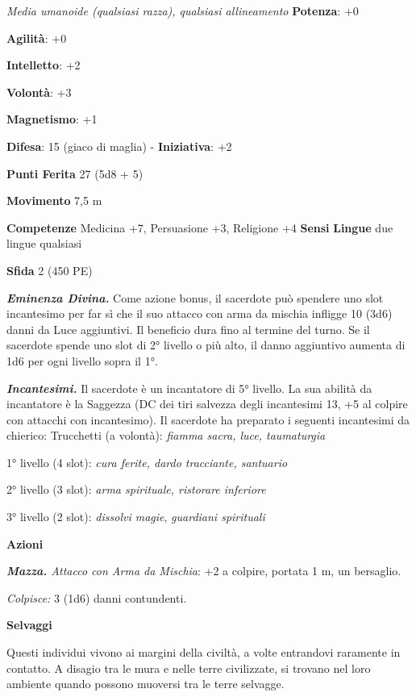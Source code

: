 \begin{multicols}{2}
\emph{Media umanoide (qualsiasi razza), qualsiasi allineamento}
\textbf{Potenza}: +0

\textbf{Agilità}: +0

\textbf{Intelletto}: +2

\textbf{Volontà}: +3

\textbf{Magnetismo}: +1

\textbf{Difesa}: 15 (giaco di maglia) - \textbf{Iniziativa}: +2

\textbf{Punti Ferita} 27 (5d8 + 5)

\textbf{Movimento} 7,5 m

\textbf{Competenze} Medicina +7, Persuasione +3, Religione +4
\textbf{Sensi}  \textbf{Lingue} due lingue
qualsiasi

\textbf{Sfida} 2 (450 PE)\smallskip

\emph{\textbf{Eminenza Divina.}} Come azione bonus, il sacerdote può
spendere uno slot incantesimo per far sì che il suo attacco con arma da
mischia infligge 10 (3d6) danni da Luce aggiuntivi. Il beneficio dura
fino al termine del turno. Se il sacerdote spende uno slot di 2° livello
o più alto, il danno aggiuntivo aumenta di 1d6 per ogni livello sopra il
1°.

\emph{\textbf{Incantesimi.}} Il sacerdote è un incantatore di 5°
livello. La sua abilità da incantatore è la Saggezza (DC dei tiri
salvezza degli incantesimi 13, +5 al colpire con attacchi con
incantesimo). Il sacerdote ha preparato i seguenti incantesimi da
chierico: Trucchetti (a volontà): \emph{fiamma sacra, luce, taumaturgia}

1° livello (4 slot): \emph{cura ferite, dardo tracciante, santuario}

2° livello (3 slot): \emph{arma spirituale, ristorare inferiore}

3° livello (2 slot): \emph{dissolvi magie}, \emph{guardiani spirituali}

\smallskip\textbf{Azioni}

\emph{\textbf{Mazza.} Attacco con Arma da Mischia}: +2 a colpire,
portata 1 m, un bersaglio.

\emph{Colpisce:} 3 (1d6) danni contundenti.



\textbf{Selvaggi}

Questi individui vivono ai margini della civiltà, a volte entrandovi
raramente in contatto. A disagio tra le mura e nelle terre civilizzate,
si trovano nel loro ambiente quando possono muoversi tra le terre
selvagge.


\end{multicols}
